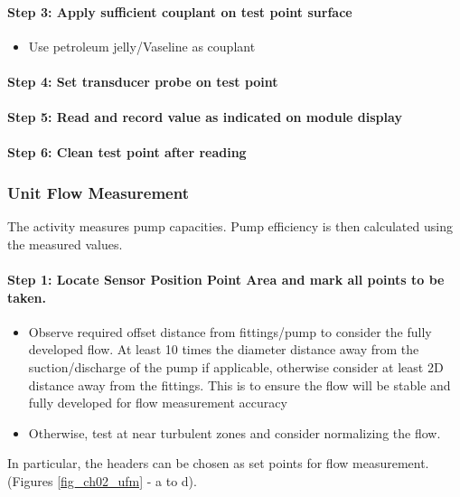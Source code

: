 \paragraph{Step 3: Apply sufficient couplant on test point surface}
\begin{itemize}
\item	Use petroleum jelly/Vaseline as couplant
\end{itemize}

\paragraph{Step 4: Set transducer probe on test point}

\paragraph{Step 5: Read and record value as indicated on module display} 


\paragraph{Step 6: Clean test point after reading}

\subsubsection{Unit Flow Measurement}
The activity measures pump capacities. Pump efficiency is then calculated using the measured values.  

\paragraph{Step 1: Locate Sensor Position Point Area and mark all points to be taken.}

\begin{itemize}
	\item Observe required offset distance from fittings/pump to consider the fully developed flow. At least 10 times the diameter distance away from the suction/discharge of the pump if applicable, otherwise consider at least 2D distance away from the fittings. This is to ensure the flow will be stable and fully developed for flow measurement accuracy %
	\item Otherwise, test at near turbulent zones and consider normalizing the flow. 
\end{itemize}

In particular, the headers can be chosen as set points for flow measurement. (Figures \ref{fig_ch02_ufm} - a to d).

